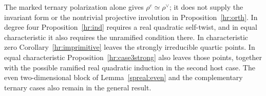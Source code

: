 The marked ternary polarization alone gives
\(\rho^c\simeq\rho^\vee\); it does not supply the invariant form
or the nontrivial projective involution in
Proposition~\ref{hr:orth}. In degree four
Proposition~\ref{hr:ind} requires a real quadratic self-twist,
and in equal characteristic it also requires the unramified
condition there. In characteristic zero Corollary~\ref{hr:imprimitive}
leaves the strongly irreducible quartic points. In equal
characteristic Proposition~\ref{hr:case3strong} also leaves those
points, together with the possible ramified real quadratic induction
in the second host case. The even two-dimensional block of
Lemma~\ref{spreal:even} and the complementary ternary cases also
remain in the general result.
